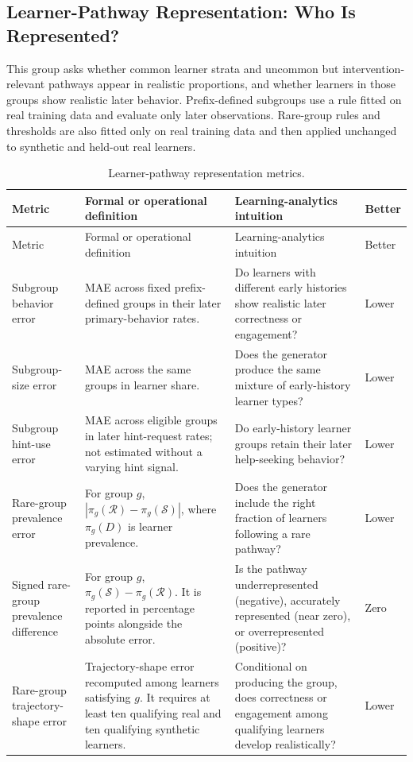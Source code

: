 \documentclass[10pt]{article}
\newcommand{\R}{\mathcal{R}}
\newcommand{\SYN}{\mathcal{S}}
\begin{document}
\subsection{Learner-Pathway Representation: Who Is Represented?}

This group asks whether common learner strata and uncommon but
intervention-relevant pathways appear in realistic proportions, and whether
learners in those groups show realistic later behavior. Prefix-defined subgroups use a rule fitted on real
training data and evaluate only later observations.  Rare-group rules and
thresholds are also fitted only on real training data and then applied
unchanged to synthetic and held-out real learners.

\begin{longtable}{@{}p{3.5cm}p{6.1cm}p{5.2cm}p{1.4cm}@{}}
\caption{Learner-pathway representation metrics.}\label{tab:supp-dictionary-pathways}\\
\toprule
Metric & Formal or operational definition & Learning-analytics intuition & Better \\
\midrule
\endfirsthead
\toprule
Metric & Formal or operational definition & Learning-analytics intuition & Better \\
\midrule
\endhead
\bottomrule
\endlastfoot
Subgroup behavior error & MAE across fixed prefix-defined groups in their later primary-behavior rates. & Do learners with different early histories show realistic later correctness or engagement? & Lower \\
Subgroup-size error & MAE across the same groups in learner share. & Does the generator produce the same mixture of early-history learner types? & Lower \\
Subgroup hint-use error & MAE across eligible groups in later hint-request rates; not estimated without a varying hint signal. & Do early-history learner groups retain their later help-seeking behavior? & Lower \\
Rare-group prevalence error & For group \(g\), \(|\pi_g(\R)-\pi_g(\SYN)|\), where \(\pi_g(D)\) is learner prevalence. & Does the generator include the right fraction of learners following a rare pathway? & Lower \\
Signed rare-group prevalence difference & For group \(g\), \(\pi_g(\SYN)-\pi_g(\R)\).  It is reported in percentage points alongside the absolute error. & Is the pathway underrepresented (negative), accurately represented (near zero), or overrepresented (positive)? & Zero \\
Rare-group trajectory-shape error & Trajectory-shape error recomputed among learners satisfying \(g\).  It requires at least ten qualifying real and ten qualifying synthetic learners. & Conditional on producing the group, does correctness or engagement among qualifying learners develop realistically? & Lower \\
\end{longtable}
\end{document}
